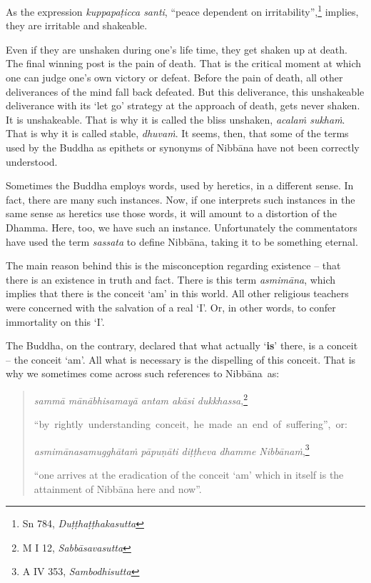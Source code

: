 As the expression \emph{kuppapaṭicca santi}, ``peace dependent on irritability'',\footnote{Sn 784, \emph{Duṭṭhaṭṭhakasutta}} implies, they are irritable and shakeable.

Even if they are unshaken during one's life time, they get shaken up at death. The final winning post is the pain of death. That is the critical moment at which one can judge one's own victory or defeat. Before the pain of death, all other deliverances of the mind fall back defeated. But this deliverance, this unshakeable deliverance with its `let go' strategy at the approach of death, gets never shaken. It is unshakeable. That is why it is called the bliss unshaken, \emph{acalaṁ sukhaṁ}. That is why it is called stable, \emph{dhuvaṁ}. It seems, then, that some of the terms used by the Buddha as epithets or synonyms of Nibbāna have not been correctly understood.

Sometimes the Buddha employs words, used by heretics, in a different sense. In fact, there are many such instances. Now, if one interprets such instances in the same sense as heretics use those words, it will amount to a distortion of the Dhamma. Here, too, we have such an instance. Unfortunately the commentators have used the term \emph{sassata} to define Nibbāna, taking it to be something eternal.

The main reason behind this is the misconception regarding existence -- that there is an existence in truth and fact. There is this term \emph{asmimāna}, which implies that there is the conceit `am' in this world. All other religious teachers were concerned with the salvation of a real `I'. Or, in other words, to confer immortality on this `I'.

The Buddha, on the contrary, declared that what actually `\textbf{is}' there, is a conceit -- the conceit `am'. All what is necessary is the dispelling of this conceit. That is why we sometimes come across such references to Nibbāna~as:

\begin{quote}
\emph{sammā mānābhisamayā antam akāsi dukkhassa},\footnote{M I 12, \emph{Sabbāsavasutta}}

\mbox{``by rightly understanding conceit, he made an end of suffering'', or:}

\emph{asmimānasamugghātaṁ pāpuṇāti diṭṭheva dhamme Nibbānaṁ},\footnote{A IV 353, \emph{Sambodhisutta}}

``one arrives at the eradication of the conceit `am' which in itself is the attainment of Nibbāna here and now''.
\end{quote}

